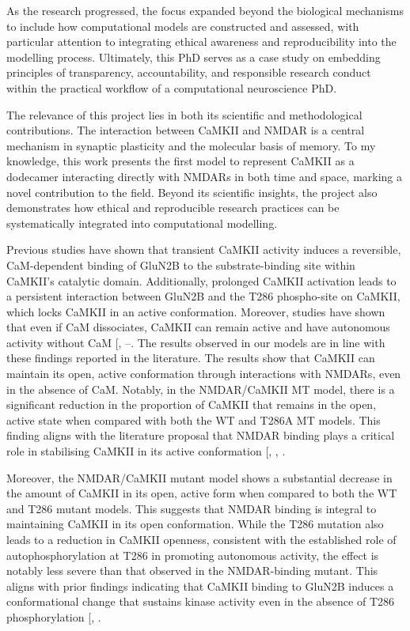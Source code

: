 \documentclass[
  11pt,
  letterpaper,
]{scrreprt}
\begin{document}
As the research progressed, the focus expanded beyond the biological
mechanisms to include how computational models are constructed and
assessed, with particular attention to integrating ethical awareness and
reproducibility into the modelling process. Ultimately, this PhD serves
as a case study on embedding principles of transparency, accountability,
and responsible research conduct within the practical workflow of a
computational neuroscience PhD.

The relevance of this project lies in both its scientific and
methodological contributions. The interaction between CaMKII and NMDAR
is a central mechanism in synaptic plasticity and the molecular basis of
memory. To my knowledge, this work presents the first model to represent
CaMKII as a dodecamer interacting directly with NMDARs in both time and
space, marking a novel contribution to the field. Beyond its scientific
insights, the project also demonstrates how ethical and reproducible
research practices can be systematically integrated into computational
modelling.

Previous studies have shown that transient CaMKII activity induces a
reversible, CaM-dependent binding of GluN2B to the substrate-binding
site within CaMKII's catalytic domain. Additionally, prolonged CaMKII
activation leads to a persistent interaction between GluN2B and the T286
phospho-site on CaMKII, which locks CaMKII in an active conformation.
Moreover, studies have shown that even if CaM dissociates, CaMKII can
remain active and have autonomous activity without CaM
{[},
--\citeproc{ref-buard2010CaMKII}{189}{]}.
The results observed in our models are in line with these findings
reported in the literature. The results show that CaMKII can maintain
its open, active conformation through interactions with NMDARs, even in
the absence of CaM. Notably, in the NMDAR/CaMKII MT model, there is a
significant reduction in the proportion of CaMKII that remains in the
open, active state when compared with both the WT and T286A MT models.
This finding aligns with the literature proposal that NMDAR binding
plays a critical role in stabilising CaMKII in its active conformation
{[},
,
\citeproc{ref-bayer2006Transitionb}{214}{]}.

Moreover, the NMDAR/CaMKII mutant model shows a substantial decrease in
the amount of CaMKII in its open, active form when compared to both the
WT and T286 mutant models. This suggests that NMDAR binding is integral
to maintaining CaMKII in its open conformation. While the T286 mutation
also leads to a reduction in CaMKII openness, consistent with the
established role of autophosphorylation at T286 in promoting autonomous
activity, the effect is notably less severe than that observed in the
NMDAR-binding mutant. This aligns with prior findings indicating that
CaMKII binding to GluN2B induces a conformational change that sustains
kinase activity even in the absence of T286 phosphorylation
{[},
\citeproc{ref-cook2022CaMKIIb}{213}{]}.
\end{document}
